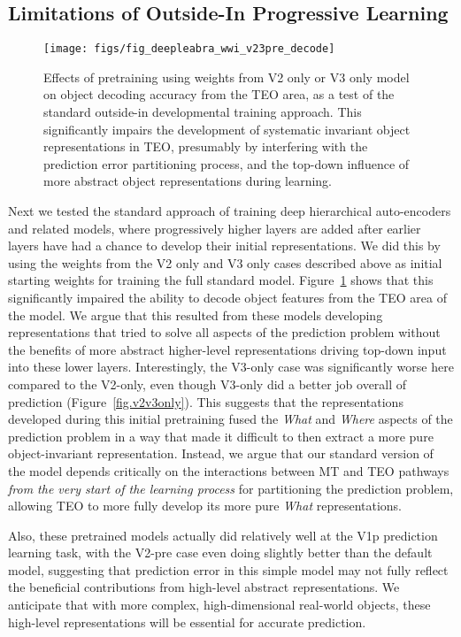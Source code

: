 \documentclass[11pt,twoside]{article}
\newif\myifpdf
\begin{document}
\subsection{Limitations of Outside-In Progressive Learning}

\begin{figure}
  \centering\texttt{[image: figs/fig\_deepleabra\_wwi\_v23pre\_decode]}
  \caption{\footnotesize Effects of pretraining using weights from V2 only or V3 only model on object decoding accuracy from the TEO area, as a test of the standard outside-in developmental training approach.  This significantly impairs the development of systematic invariant object representations in TEO, presumably by interfering with the prediction error partitioning process, and the top-down influence of more abstract object representations during learning.}
  \label{fig.v23_pre}
\end{figure}

Next we tested the standard approach of training deep hierarchical auto-encoders and related models, where progressively higher layers are added after earlier layers have had a chance to develop their initial representations.  We did this by using the weights from the V2 only and V3 only cases described above as initial starting weights for training the full standard model.  Figure~\ref{fig.v23_pre} shows that this significantly impaired the ability to decode object features from the TEO area of the model.  We argue that this resulted from these models developing representations that tried to solve all aspects of the prediction problem without the benefits of more abstract higher-level representations driving top-down input into these lower layers.  Interestingly, the V3-only case was significantly worse here compared to the V2-only, even though V3-only did a better job overall of prediction (Figure~\ref{fig.v2v3only}).  This suggests that the representations developed during this initial pretraining fused the {\em What} and {\em Where} aspects of the prediction problem in a way that made it difficult to then extract a more pure object-invariant representation.  Instead, we argue that our standard version of the model depends critically on the interactions between MT and TEO pathways {\em from the very start of the learning process} for partitioning the prediction problem, allowing TEO to more fully develop its more pure {\em What} representations.

Also, these pretrained models actually did relatively well at the V1p prediction learning task, with the V2-pre case even doing slightly better than the default model, suggesting that prediction error in this simple model may not fully reflect the beneficial contributions from high-level abstract representations.  We anticipate that with more complex, high-dimensional real-world objects, these high-level representations will be essential for accurate prediction.
\end{document}
